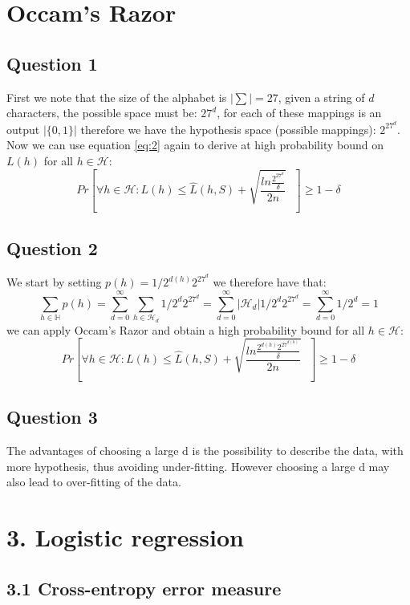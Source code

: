 \documentclass{article}
\begin{document}
\section{Occam's Razor}
\subsection{Question 1}
First we note that the size of the alphabet is $|\sum| = 27$, given a string of $d$ characters, the possible space must be: $27^d$, for each of these mappings is an output $|\lbrace 0,1 \rbrace |$ therefore we have the hypothesis space (possible mappings): $
2^{27^{d}} $.
Now we can use equation \ref{eq:2} again to derive at high probability bound on $L(h)$ for all $h \in \mathcal{H}$:
\begin{equation*}
Pr \left[
\forall h \in \mathcal{H} : L(h) \leq \hat{L}(h,S) + \sqrt{ \dfrac{ ln \frac{2^{27^{d}}}{\delta}}{2n}}
 \textbf{ } \right] \geq 1 - \delta
\end{equation*}
\subsection{Question 2}
We start by setting $p(h)= 1/2^{d(h)}2^{27^d}$ we therefore have that:
\begin{equation*}
\sum\limits_{h \in \mathbb{H}} p(h) = \sum\limits_{d=0}^\infty \sum\limits_{h \in \mathcal{H}_d} 1/2^{d}2^{27^d} =
\sum\limits_{d=0}^\infty |\mathcal{H}_d| 1/2^{d}2^{27^d} = 
\sum\limits_{d=0}^\infty 1/2^{d} = 1
\end{equation*}
we can apply Occam's Razor and obtain a high probability bound for all $h \in \mathcal{H}$:
\begin{equation*}
Pr \left[
\forall h \in \mathcal{H} : L(h) \leq \hat{L}(h,S) + \sqrt{ \dfrac{ ln \frac{2^{d(h)} 2^{27^{d(h)}}}{\delta}}{2n}}
 \textbf{ } \right] \geq 1 - \delta
\end{equation*}


\subsection{Question 3}
The advantages of choosing a large d is the possibility to describe the data, with more hypothesis, thus avoiding under-fitting. However choosing a large d may also lead to over-fitting of the data.
\section{3. Logistic regression}
\subsection{3.1 Cross-entropy error measure}
\end{document}
